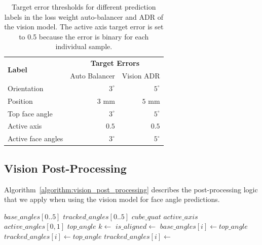 \begin{table}[h!]
    \footnotesize
    \centering
    \caption{Target error thresholds for different prediction labels in the loss weight auto-balancer and ADR of the vision model. The active axis target error is set to 0.5 because the error is binary for each individual sample.}
    \renewcommand{\arraystretch}{1.3}
    \begin{tabular}{@{}lrr@{}}
        \toprule
        \multirow{2}{*}{\textbf{Label}} & \multicolumn{2}{c}{\textbf{Target Errors}} \\
        & Auto Balancer & Vision ADR \\
        \midrule
        Orientation & $3^\circ$ & $5^\circ$ \\
        Position & $3$ mm & $5$ mm \\
        Top face angle & $3^\circ$ & $5^\circ$ \\
        Active axis & $0.5$ & $0.5$ \\
        Active face angles & $3^\circ$ & $5^\circ$ \\
    \bottomrule\end{tabular}
    \label{tbl:vision-auto-balancer}
\end{table}

\FloatBarrier

\subsection{Vision Post-Processing}

Algorithm~\ref{algorithm:vision_post_processing} describes the post-processing logic that we apply when using the vision model for face angle predictions.
 
\begin{algorithm}
\caption{Vision model post-processing logic for tracking the full state of a Rubik's cube on the physical robot.}
\label{algorithm:vision_post_processing}
\begin{algorithmic}
\Require $base\_angles[0..5]$ 
\Require $tracked\_angles[0..5]$
\Require $cube\_quat$ 
\Require $active\_axis$ 
\Require $active\_angles[0,1]$ 
\Require $top\_angle$ 
\State $k \gets$ 
\State $is\_aligned \gets$ 
     
        \State $base\_angles[i] \gets top\_angle$
        \State $tracked\_angles[i] \gets top\_angle$
    \Else
         
            \State $tracked\_angles[i] \gets$  
        \EndIf
    \EndIf
\EndFor
\end{algorithmic}
\end{algorithm}


